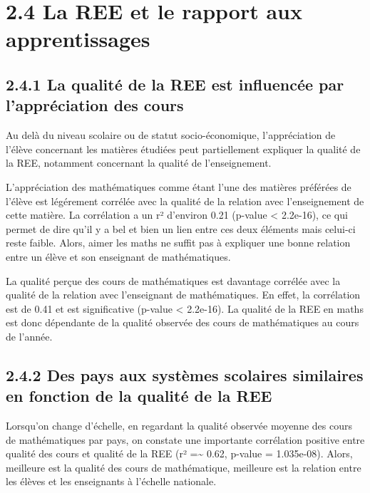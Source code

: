 \documentclass[
  french,
  11pt,
  a4paper,
  oneside]{report}
\begin{document}

\section{2.4 La REE et le rapport aux
apprentissages}\label{la-ree-et-le-rapport-aux-apprentissages}

\subsection{2.4.1 La qualité de la REE est influencée par l'appréciation
des
cours}\label{la-qualituxe9-de-la-ree-est-influencuxe9e-par-lappruxe9ciation-des-cours}

Au delà du niveau scolaire ou de statut socio-économique, l'appréciation
de l'élève concernant les matières étudiées peut partiellement expliquer
la qualité de la REE, notamment concernant la qualité de l'enseignement.

L'appréciation des mathématiques comme étant l'une des matières
préférées de l'élève est légérement corrélée avec la qualité de la
relation avec l'enseignement de cette matière. La corrélation a un r²
d'environ 0.21 (p-value \textless{} 2.2e-16), ce qui permet de dire
qu'il y a bel et bien un lien entre ces deux éléments mais celui-ci
reste faible. Alors, aimer les maths ne suffit pas à expliquer une bonne
relation entre un élève et son enseignant de mathématiques.

La qualité perçue des cours de mathématiques est davantage corrélée avec
la qualité de la relation avec l'enseignant de mathématiques. En effet,
la corrélation est de 0.41 et est significative (p-value \textless{}
2.2e-16). La qualité de la REE en maths est donc dépendante de la
qualité observée des cours de mathématiques au cours de l'année.

\subsection{2.4.2 Des pays aux systèmes scolaires similaires en fonction
de la qualité de la
REE}\label{des-pays-aux-systuxe8mes-scolaires-similaires-en-fonction-de-la-qualituxe9-de-la-ree}

Lorsqu'on change d'échelle, en regardant la qualité observée moyenne des
cours de mathématiques par pays, on constate une importante corrélation
positive entre qualité des cours et qualité de la REE (r²
=\textasciitilde{} 0.62, p-value = 1.035e-08). Alors, meilleure est la
qualité des cours de mathématique, meilleure est la relation entre les
élèves et les enseignants à l'échelle nationale.
\end{document}
